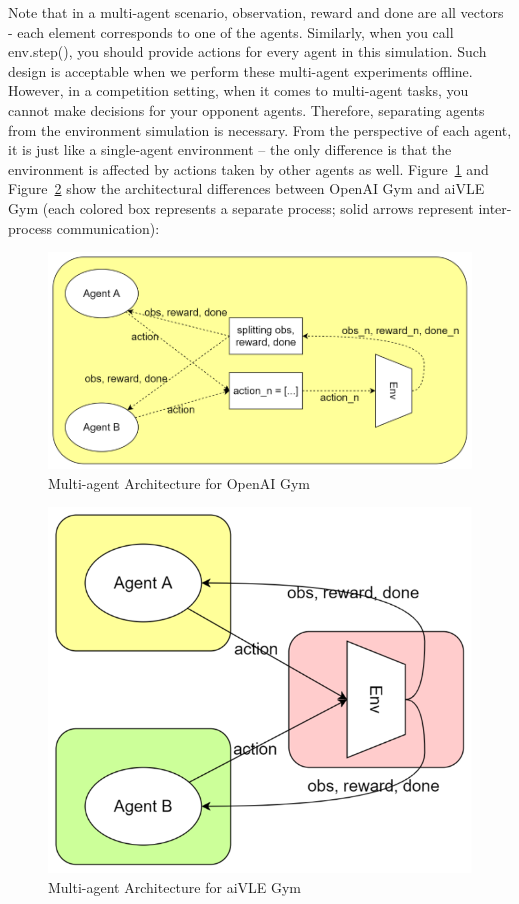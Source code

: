 Note that in a multi-agent scenario, observation, reward and done are all vectors - each element corresponds to one of the agents. Similarly, when you call env.step(), you should provide actions for every agent in this simulation. Such design is acceptable when we perform these multi-agent experiments offline. However, in a competition setting, when it comes to multi-agent tasks, you cannot make decisions for your opponent agents. Therefore, separating agents from the environment simulation is necessary. From the perspective of each agent, it is just like a single-agent environment – the only difference is that the environment is affected by actions taken by other agents as well. Figure~\ref{fig:opanai-gym-multi-arch} and Figure~\ref{fig:aivle-gym-multi-arch} show the architectural differences between OpenAI Gym and aiVLE Gym (each colored box represents a separate process; solid arrows represent inter-process communication):
\begin{figure}[H]
    \centering
    \includegraphics{images/opanai-gym-multi-arch.png}
    \caption{Multi-agent Architecture for OpenAI Gym}
    \label{fig:opanai-gym-multi-arch}
\end{figure}
\begin{figure}[H]
    \centering
    \includegraphics{images/aivle-gym-multi-arch.png}
    \caption{Multi-agent Architecture for aiVLE Gym}
    \label{fig:aivle-gym-multi-arch}
\end{figure}

